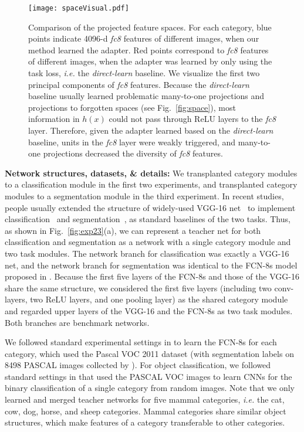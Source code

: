 \documentclass[10pt,twocolumn,letterpaper]{article}
\begin{document}
\begin{figure*}[t]
\centering
\texttt{[image: spaceVisual.pdf]}
\vspace{2pt}
\caption{Comparison of the projected feature spaces. For each category, blue points indicate 4096-d \textit{fc8} features of different images, when our method learned the adapter. Red points correspond to \textit{fc8} features of different images, when the adapter was learned by only using the task loss, \emph{i.e.} the \textit{direct-learn} baseline. We visualize the first two principal components of \textit{fc8} features. Because the \textit{direct-learn} baseline usually learned problematic many-to-one projections and projections to forgotten spaces (see Fig.~\ref{fig:space}), most information in $h(x)$ could not pass through ReLU layers to the \textit{fc8} layer. Therefore, given the adapter learned based on the \textit{direct-learn} baseline, units in the \textit{fc8} layer were weakly triggered, and many-to-one projections decreased the diversity of \textit{fc8} features.}
\label{fig:spaceVisual}
\end{figure*}

\textbf{Network structures, datasets, \& details:} We transplanted category modules to a classification module in the first two experiments, and transplanted category modules to a segmentation module in the third experiment. In recent studies, people usually extended the structure of widely-used VGG-16 net~\cite{VGG} to implement classification~\cite{VGG,interpretableCNN} and segmentation~\cite{VGGSeg}, as standard baselines of the two tasks. Thus, as shown in Fig.~\ref{fig:exp23}(a), we can represent a teacher net for both classification and segmentation as a network with a single category module and two task modules. The network branch for classification was exactly a VGG-16 net, and the network branch for segmentation was identical to the FCN-8s model proposed in \cite{VGGSeg}. Because the first five layers of the FCN-8s and those of the VGG-16 share the same structure, we considered the first five layers (including two conv-layers, two ReLU layers, and one pooling layer) as the shared category module and regarded upper layers of the VGG-16 and the FCN-8s as two task modules. Both branches are benchmark networks.

We followed standard experimental settings in \cite{VGGSeg} to learn the FCN-8s for each category, which used the Pascal VOC 2011 dataset (with segmentation labels on 8498 PASCAL images collected by \cite{VOCSeg}). For object classification, we followed standard settings in \cite{interpretableCNN} that used the PASCAL VOC images to learn CNNs for the binary classification of a single category from random images. Note that we only learned and merged teacher networks for five mammal categories, \emph{i.e.} the cat, cow, dog, horse, and sheep categories. Mammal categories share similar object structures, which make features of a category transferable to other categories.
\end{document}
